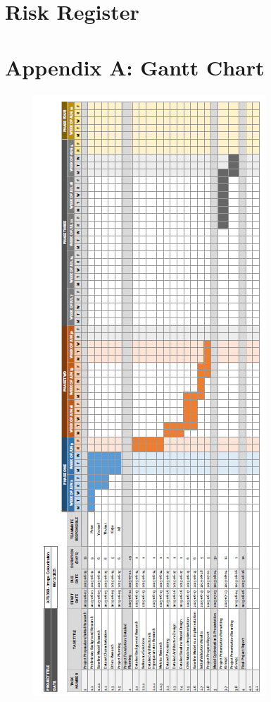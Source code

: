\documentclass{article} %
\begin{document}
\section{Risk Register}
\label{risk_register}

\label{last_page}




\section{Appendix A: Gantt Chart}
\begin{figure}[htbp]
  \centering
  \includegraphics[width=0.58\linewidth]{Figs/gant-chart-full.jpg}
  \label{fig:gantt_chart}
\end{figure}
\end{document}
